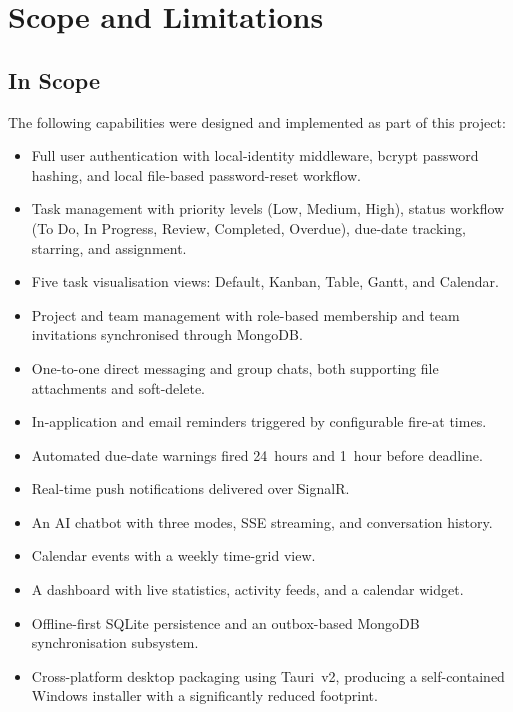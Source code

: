 \section{Scope and Limitations}\label{sec:intro_scope}

\subsection*{In Scope}

The following capabilities were designed and implemented as part of this project:

\begin{itemize}
    \item Full user authentication with local-identity middleware, bcrypt password hashing, and
          local file-based password-reset workflow.
    \item Task management with priority levels (Low, Medium, High), status workflow
          (To Do, In Progress, Review, Completed, Overdue), due-date tracking, starring,
          and assignment.
    \item Five task visualisation views: Default, Kanban, Table, Gantt, and Calendar.
    \item Project and team management with role-based membership and team invitations
          synchronised through MongoDB.
    \item One-to-one direct messaging and group chats, both supporting file attachments
          and soft-delete.
    \item In-application and email reminders triggered by configurable fire-at times.
    \item Automated due-date warnings fired 24~hours and 1~hour before deadline.
    \item Real-time push notifications delivered over SignalR.
    \item An AI chatbot with three modes, SSE streaming, and conversation history.
    \item Calendar events with a weekly time-grid view.
    \item A dashboard with live statistics, activity feeds, and a calendar widget.
    \item Offline-first SQLite persistence and an outbox-based MongoDB synchronisation
          subsystem.
    \item Cross-platform desktop packaging using Tauri~v2, producing a
          self-contained Windows installer with a significantly reduced footprint.
\end{itemize}

